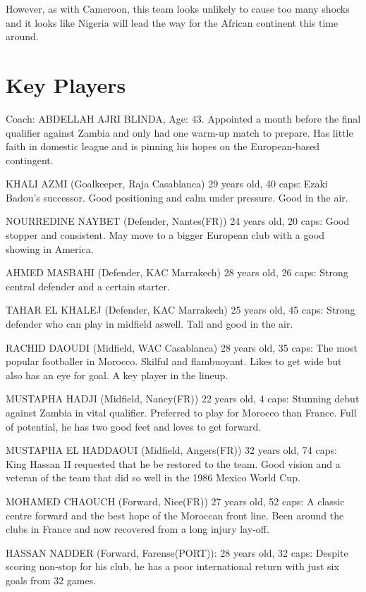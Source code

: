 However, as with Cameroon, this team looks unlikely to cause too many shocks 
and it looks like Nigeria will lead the way for the African continent this 
time around.
\section{Key Players}
Coach:
ABDELLAH AJRI BLINDA, Age: 43. Appointed a month before the final qualifier
against Zambia and only had one warm-up match to prepare. Has little faith in
domestic league and is pinning his hopes on the European-based contingent.

KHALI AZMI (Goalkeeper, Raja Casablanca) 29 years old, 40 caps:
Ezaki Badou's successor. Good positioning and calm under pressure. Good in the 
air.

NOURREDINE NAYBET (Defender, Nantes(FR)) 24 years old, 20 caps:
Good stopper and consistent. May move to a bigger European club with a good 
showing in America.

AHMED MASBAHI (Defender, KAC Marrakech) 28 years old, 26 caps:
Strong central defender and a certain starter.

TAHAR EL KHALEJ (Defender, KAC Marrakech) 25 years old, 45 caps: 
Strong defender who can play in midfield aswell. Tall and good in the air.

RACHID DAOUDI (Midfield, WAC Casablanca) 28 years old, 35 caps: 
The most popular footballer in Morocco. Skilful and flambuoyant. Likes to get 
wide but also has an eye for goal. A key player in the lineup.

MUSTAPHA HADJI (Midfield, Nancy(FR)) 22 years old, 4 caps: 
Stunning debut against Zambia in vital qualifier. Preferred to play for  
Morocco than France. Full of potential, he has two good feet and loves to get 
forward.

MUSTAPHA EL HADDAOUI (Midfield, Angers(FR)) 32 years old, 74 caps: 
King Hassan II requested that he be restored to the team. Good vision and a 
veteran of the team that did so well in the 1986 Mexico World Cup.

MOHAMED CHAOUCH (Forward, Nice(FR)) 27 years old, 52 caps: 
A classic centre forward and the best hope of the Moroccan front line. Been 
around the clubs in France and now recovered from a long injury lay-off.

HASSAN NADDER (Forward, Farense(PORT)): 28 years old, 32 caps: 
Despite scoring non-stop for his club, he has a poor international return with
just six goals from 32 games.

